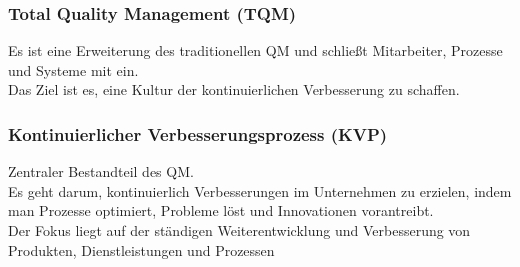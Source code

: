 \documentclass[asp1.tex]{subfiles}
\begin{document}
\subsubsection{Total Quality Management (TQM)}
Es ist eine Erweiterung des traditionellen QM und schließt Mitarbeiter, Prozesse und Systeme mit ein. \\
Das Ziel ist es, eine Kultur der kontinuierlichen Verbesserung zu schaffen.

\subsubsection{Kontinuierlicher Verbesserungsprozess (KVP)}
Zentraler Bestandteil des QM. \\
Es geht darum, kontinuierlich Verbesserungen im Unternehmen zu erzielen, indem man Prozesse optimiert, Probleme l\"ost und Innovationen vorantreibt. \\
Der Fokus liegt auf der st\"andigen Weiterentwicklung und Verbesserung von Produkten, Dienstleistungen und Prozessen
\end{document}
